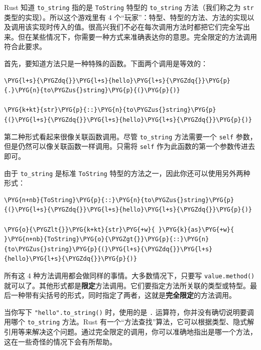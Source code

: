 Rust 知道 \texttt{to\_string} 指的是 \texttt{ToString} 特型的 \texttt{to\_string} 方法（我们称之为 \texttt{str} 类型的实现）。所以这个游戏里有 4 个“玩家”：特型、特型的方法、方法的实现以及调用该实现时传入的值。很高兴我们不必在每次调用方法时都把它们完全写出来。但在某些情况下，你需要一种方式来准确表达你的意思。完全限定的方法调用符合此要求。

首先，要知道方法只是一种特殊的函数。下面两个调用是等效的：

\begin{Verbatim}[commandchars=\\\{\},breaklines=true,breakanywhere=true,fontsize=\codefont,xleftmargin=17bp]
\PYG{l+s}{\PYGZdq{}}\PYG{l+s}{hello}\PYG{l+s}{\PYGZdq{}}\PYG{p}{.}\PYG{n}{to\PYGZus{}string}\PYG{p}{(}\PYG{p}{)}

\PYG{k+kt}{str}\PYG{p}{::}\PYG{n}{to\PYGZus{}string}\PYG{p}{(}\PYG{l+s}{\PYGZdq{}}\PYG{l+s}{hello}\PYG{l+s}{\PYGZdq{}}\PYG{p}{)}
\end{Verbatim}

第二种形式看起来很像关联函数调用。尽管 \texttt{to\_string} 方法需要一个 \texttt{self} 参数，但是仍然可以像关联函数一样调用。只需将 \texttt{self} 作为此函数的第一个参数传进去即可。

由于 \texttt{to\_string} 是标准 \texttt{ToString} 特型的方法之一，因此你还可以使用另外两种形式：

\begin{Verbatim}[commandchars=\\\{\},breaklines=true,breakanywhere=true,fontsize=\codefont,xleftmargin=17bp]
\PYG{n+nb}{ToString}\PYG{p}{::}\PYG{n}{to\PYGZus{}string}\PYG{p}{(}\PYG{l+s}{\PYGZdq{}}\PYG{l+s}{hello}\PYG{l+s}{\PYGZdq{}}\PYG{p}{)}

\PYG{o}{\PYGZlt{}}\PYG{k+kt}{str}\PYG{+w}{ }\PYG{k}{as}\PYG{+w}{ }\PYG{n+nb}{ToString}\PYG{o}{\PYGZgt{}}\PYG{p}{::}\PYG{n}{to\PYGZus{}string}\PYG{p}{(}\PYG{l+s}{\PYGZdq{}}\PYG{l+s}{hello}\PYG{l+s}{\PYGZdq{}}\PYG{p}{)}
\end{Verbatim}

所有这 4 种方法调用都会做同样的事情。大多数情况下，只要写 \texttt{value.method()} 就可以了。其他形式都是\textbf{限定}方法调用。它们要指定方法所关联的类型或特型。最后一种带有尖括号的形式，同时指定了两者，这就是\textbf{完全限定}的方法调用。

当你写下 \texttt{"hello".to\_string()} 时，使用的是 \texttt{.} 运算符，你并没有确切说明要调用哪个 \texttt{to\_string} 方法。Rust 有一个“方法查找”算法，它可以根据类型、隐式解引用等来解决这个问题。通过完全限定的调用，你可以准确地指出是哪一个方法，这在一些奇怪的情况下会有所帮助。

